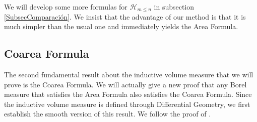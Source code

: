 \documentclass[%
 aip,
 amsmath,amssymb,
 reprint,%
jmp]{revtex4-2}
\begin{document}
We will develop some more formulas for $\mathcal{H}_{m\leq n}$ in subsection \ref{SubsecComparación}. We insist that the advantage of our method is that it is much simpler than the usual one and immediately yields the Area Formula.

\subsection{Coarea Formula}

The second fundamental result about the inductive volume measure that we will prove is the Coarea Formula. We will actually give a new proof that any Borel measure that satisfies the Area Formula also satisfies the Coarea Formula. Since the inductive volume measure is defined through Differential Geometry, we first establish the smooth version of this result. We follow the proof of \cite{Chavel}.
\end{document}
